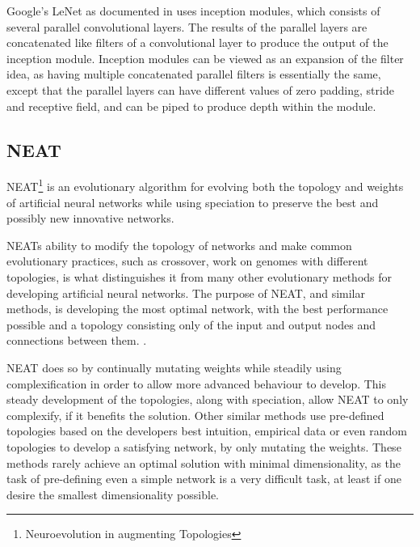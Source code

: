 Google's LeNet as documented in \cite{christian} uses inception modules, which consists of several parallel convolutional layers. The results of the parallel layers are concatenated like filters of a convolutional layer to produce the output of the inception module. Inception modules can be viewed as an expansion of the filter idea, as having multiple concatenated parallel filters is essentially the same, except that the parallel layers can have different values of zero padding, stride and receptive field, and can be piped to produce depth within the module.

\subsection{NEAT}
\label{sec:neat}
NEAT\footnote{Neuroevolution in augmenting Topologies} is an evolutionary algorithm for evolving both the topology and weights of artificial neural networks while using speciation to preserve the best and possibly new innovative networks.

NEATs ability to modify the topology of networks and make common evolutionary practices, such as crossover, work on genomes with different topologies, is what distinguishes it from many other evolutionary methods for developing artificial neural networks. The purpose of NEAT, and similar methods, is developing the most optimal network, with the best performance possible and a topology consisting only of the input and output nodes and connections between them. .

NEAT does so by continually mutating weights while steadily using complexification in order to allow more advanced behaviour to develop. This steady development of the topologies, along with speciation, allow NEAT to only complexify, if it benefits the solution. 
Other similar methods use pre-defined topologies based on the developers best intuition, empirical data or even random topologies to develop a satisfying network, by only mutating the weights. These methods rarely achieve an optimal solution with minimal dimensionality, as the task of pre-defining even a simple network is a very difficult task, at least if one desire the smallest dimensionality possible.


